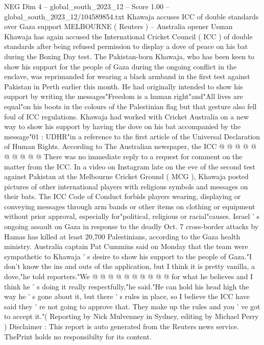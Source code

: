 \begin{textsample}{NEG Dim 4 – global\_south\_2023\_12 – Score 1.00 – global\_south\_2023\_12/104589854.txt}  \label{ex:f4_neg_329}
Khawaja accuses ICC of double standards over Gaza support MELBOURNE ( Reuters ) -- Australia opener Usman Khawaja has again accused the International Cricket Council ( ICC ) of double standards after being refused permission to display a dove of peace on his bat during the Boxing Day test.
The Pakistan-born Khawaja, who has been keen to show his support for the people of Gaza during the ongoing conflict in the enclave, was reprimanded for wearing a black armband in the first test against Pakistan in Perth earlier this month.
He had originally intended to show his support by writing the messages"Freedom is a human right"and"All lives are equal"on his boots in the colours of the Palestinian flag but that gesture also fell foul of ICC regulations.
Khawaja had worked with Cricket Australia on a new way to show his support by having the dove on his bat accompanied by the message"01 : UDHR"in a reference to the first article of the Universal Declaration of Human Rights.
According to The Australian newspaper, the ICC @ @ @ @ @ @ @ @ @ @ There was no immediate reply to a request for comment on the matter from the ICC.
In a video on Instagram late on the eve of the second test against Pakistan at the Melbourne Cricket Ground ( MCG ), Khawaja posted pictures of other international players with religious symbols and messages on their bats.
The ICC Code of Conduct forbids players wearing, displaying or conveying messages through arm bands or other items on clothing or equipment without prior approval, especially for"political, religious or racial"causes.
Israel ' s ongoing assault on Gaza in response to the deadly Oct. 7 cross-border attacks by Hamas has killed at least 20,700 Palestinians, according to the Gaza health ministry.
Australia captain Pat Cummins said on Monday that the team were sympathetic to Khawaja ' s desire to show his support to the people of Gaza."I don't know the ins and outs of the application, but I think it is pretty vanilla, a dove,"he told reporters."We @ @ @ @ @ @ @ @ @ @ for what he believes and I think he ' s doing it really respectfully,"he said."He can hold his head high the way he ' s gone about it, but there ' s rules in place, so I believe the ICC have said they ' re not going to approve that.
They make up the rules and you ' ve got to accept it."( Reporting by Nick Mulvenney in Sydney, editing by Michael Perry ) Disclaimer : This report is auto generated from the Reuters news service.
ThePrint holds no responsibilty for its content.

\end{textsample}
